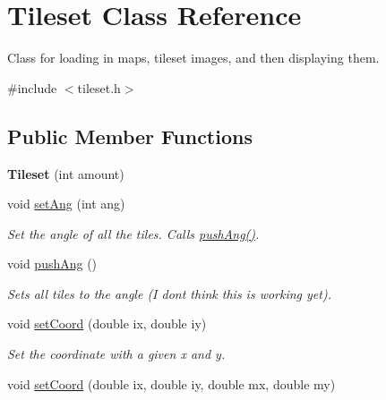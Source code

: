 \hypertarget{classTileset}{}\section{Tileset Class Reference}
\label{classTileset}


Class for loading in maps, tileset images, and then displaying them.  




{\ttfamily \#include $<$tileset.\+h$>$}

\subsection*{Public Member Functions}
\begin{DoxyCompactItemize}
\item 
{\bfseries Tileset} (int amount)\hypertarget{classTileset_a438bd441809f8e9508a6052580cfdc8b}{}\label{classTileset_a438bd441809f8e9508a6052580cfdc8b}

\item 
void \hyperlink{classTileset_a1f751647f22bce36f58fd738b97a67bd}{set\+Ang} (int ang)\hypertarget{classTileset_a1f751647f22bce36f58fd738b97a67bd}{}\label{classTileset_a1f751647f22bce36f58fd738b97a67bd}

\begin{DoxyCompactList}\small\item\em Set the angle of all the tiles. Calls \hyperlink{classTileset_adf1b34b6c742198c3d05b620ed3c25e1}{push\+Ang()}. \end{DoxyCompactList}\item 
void \hyperlink{classTileset_adf1b34b6c742198c3d05b620ed3c25e1}{push\+Ang} ()\hypertarget{classTileset_adf1b34b6c742198c3d05b620ed3c25e1}{}\label{classTileset_adf1b34b6c742198c3d05b620ed3c25e1}

\begin{DoxyCompactList}\small\item\em Sets all tiles to the angle (I don\textquotesingle{}t think this is working yet). \end{DoxyCompactList}\item 
void \hyperlink{classTileset_acc04d7d0538f4ef33cb64d638d380c96}{set\+Coord} (double ix, double iy)\hypertarget{classTileset_acc04d7d0538f4ef33cb64d638d380c96}{}\label{classTileset_acc04d7d0538f4ef33cb64d638d380c96}

\begin{DoxyCompactList}\small\item\em Set the coordinate with a given x and y. \end{DoxyCompactList}\item 
void \hyperlink{classTileset_a34cf0bb5a6326a6dbcbe3f352f3ea7a5}{set\+Coord} (double ix, double iy, double mx, double my)\hypertarget{classTileset_a34cf0bb5a6326a6dbcbe3f352f3ea7a5}{}\label{classTileset_a34cf0bb5a6326a6dbcbe3f352f3ea7a5}


\end{DoxyCompactItemize}
